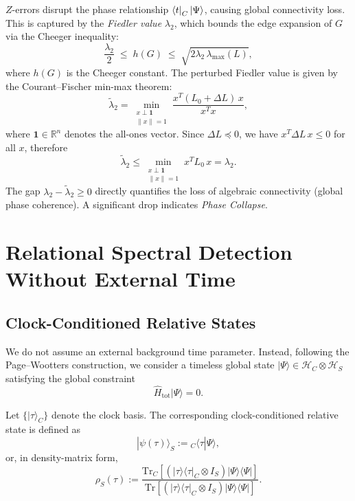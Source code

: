 \documentclass[11pt,a4paper]{article}
\theoremstyle{definition}
\theoremstyle{remark}
\begin{document}
$Z$-errors disrupt the phase relationship $\bra{t}_C\ket{\Psi}$, causing global connectivity
loss.  This is captured by the \emph{Fiedler value} $\lambda_2$, which bounds the edge
expansion of $G$ via the Cheeger inequality:
\[
  \frac{\lambda_2}{2} \;\le\; h(G) \;\le\; \sqrt{2\lambda_2\,\lambda_{\max}(L)},
\]
where $h(G)$ is the Cheeger constant.
The perturbed Fiedler value is given by the Courant--Fischer min-max theorem:
\begin{equation}\label{eq:fiedler}
  \tilde\lambda_2
    = \min_{\substack{x\perp\mathbf{1}\\\|x\|=1}}
      \frac{x^T(L_0+\Delta L)\,x}{x^Tx},
\end{equation}
where $\mathbf{1}\in\mathbb{R}^n$ denotes the all-ones vector.
Since $\Delta L\preceq 0$, we have $x^T\Delta L\,x\le 0$ for all $x$, therefore
\[
  \tilde\lambda_2
    \le \min_{\substack{x\perp\mathbf{1}\\\|x\|=1}} x^TL_0\,x = \lambda_2.
\]
The gap $\lambda_2-\tilde\lambda_2\ge 0$ directly quantifies the loss of algebraic connectivity
(global phase coherence).
A significant drop indicates \emph{Phase Collapse}.

\section{Relational Spectral Detection Without External Time}

\subsection{Clock-Conditioned Relative States}

We do not assume an external background time parameter. Instead, following the Page--Wootters
construction, we consider a timeless global state
$|\Psi\rangle \in \mathcal{H}_C \otimes \mathcal{H}_S$ satisfying the global constraint
\begin{equation}
  \hat{H}_{\mathrm{tot}} |\Psi\rangle = 0.
\end{equation}

Let $\{|\tau\rangle_C\}$ denote the clock basis. The corresponding clock-conditioned relative
state is defined as
\begin{equation}
  |\psi(\tau)\rangle_S := {}_C\langle \tau | \Psi \rangle,
\end{equation}
or, in density-matrix form,
\begin{equation}
  \rho_S(\tau)
    :=
    \frac{
      \mathrm{Tr}_C \!\left[
        \left(|\tau\rangle\langle\tau|_C \otimes I_S\right)
        |\Psi\rangle\langle\Psi|
      \right]
    }{
      \mathrm{Tr}\!\left[
        \left(|\tau\rangle\langle\tau|_C \otimes I_S\right)
        |\Psi\rangle\langle\Psi|
      \right]
    }.
\end{equation}
\end{document}
